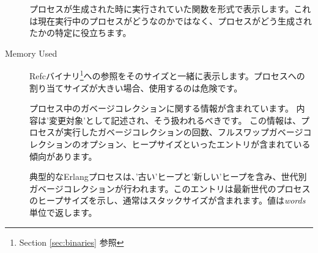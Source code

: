 \begin{description*}
\begin{description}
			\item[] プロセスが生成された時に実行されていた関数を形式で表示します。これは現在実行中のプロセスがどうなのかではなく、プロセスがどう生成されたかの特定に役立ちます。
		\end{description}
	\item[Memory Used] \hfill
		\begin{description}
			\item[] Refcバイナリ\footnote{Section \ref{sec:binaries} 参照}への参照をそのサイズと一緒に表示します。プロセスへの割り当てサイズが大きい場合、使用するのは危険です。

			\item[] プロセス中のガベージコレクションに関する情報が含まれています。
      内容は'変更対象'として記述され、そう扱われるべきです。
      この情報は、プロセスが実行したガベージコレクションの回数、フルスワップガベージコレクションのオプション、ヒープサイズといったエントリが含まれている傾向があります。

			\item[] 典型的なErlangプロセスは、'古い'ヒープと'新しい'ヒープを含み、世代別ガベージコレクションが行われます。このエントリは最新世代のプロセスのヒープサイズを示し、通常はスタックサイズが含まれます。値は\emph{words}単位で返します。


\end{description}
\end{description*}
